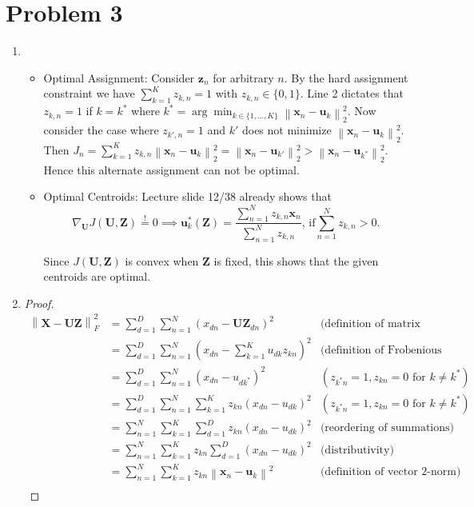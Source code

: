 \documentclass{scrartcl}
\newcommand{\norm}[1]{\left\lVert#1\right\rVert}
\begin{document}
  \section*{Problem 3} %
  \label{sec:problem_3}
  \begin{enumerate}
    \item \begin{itemize}
      \item Optimal Assignment:
        Consider $\mathbf{z}_n$ for arbitrary $n$. By the hard assignment
        constraint we have $\sum_{k=1}^K z_{k,n} = 1$ with $z_{k,n} \in \{0,1\}$.
        Line 2 dictates that $z_{k,n} = 1$ if $k = k^*$ where
        $k^* = \arg\min_{k \in \{1,\dots,K\}} \norm{\mathbf{x}_n - \mathbf{u}_k}_2^2$.
        Now consider the case where $z_{k',n} = 1$ and $k'$ does not minimize
        $\norm{\mathbf{x}_n - \mathbf{u}_k}_2^2$. Then $J_n = \sum_{k=1}^K z_{k,n}
        \norm{\mathbf{x}_n - \mathbf{u}_k}_2^2 = \norm{\mathbf{x}_n - \mathbf{u}_{k'}}_2^2
        > \norm{\mathbf{x}_n - \mathbf{u}_{k^*}}_2^2$. Hence this alternate assignment
        can not be optimal.
      \item Optimal Centroids:
        Lecture slide 12/38 already shows that
        \[
            \nabla_{\mathbf{U}} J(\mathbf{U}, \mathbf{Z}) \overset{!}{=} 0
            \implies \mathbf{u}_k^*(\mathbf{Z}) = \frac{\sum_{n=1}^N z_{k,n}\mathbf{x}_n}
            {\sum_{n=1}^N z_{k,n}}\text{, if} \sum_{n=1}^{N} z_{k,n} > 0.
        \]

        Since $J(\mathbf{U}, \mathbf{Z})$ is convex when $\mathbf{Z}$ is fixed,
        this shows that the given centroids are optimal.
    \end{itemize}
    \item \begin{proof}
    \begin{align*}
      \norm{\mathbf{X-UZ}}_F^2
       &= \sum_{d=1}^{D} \sum_{n=1}^{N} (x_{dn} - \mathbf{UZ}_{dn})^2
       &\text{(definition of matrix multiplication)}\\
       &= \sum_{d=1}^{D} \sum_{n=1}^{N} (x_{dn} - \sum_{k=1}^K u_{dk}z_{kn})^2
       &\text{(definition of Frobenious norm)}\\
       &= \sum_{d=1}^{D} \sum_{n=1}^{N} (x_{dn} - u_{dk^*})^2
       &(z_{k^*n} = 1, z_{kn} = 0\text{ for }k \neq k^*) \\
       &= \sum_{d=1}^{D} \sum_{n=1}^{N} \sum_{k=1}^{K} z_{kn} (x_{dn} - u_{dk})^2
       &(z_{k^*n} = 1, z_{kn} = 0\text{ for }k \neq k^*) \\
       &= \sum_{n=1}^{N} \sum_{k=1}^{K} \sum_{d=1}^{D} z_{kn} (x_{dn} - u_{dk})^2
       &\text{(reordering of summations)}\\
       &= \sum_{n=1}^{N} \sum_{k=1}^{K} z_{kn} \sum_{d=1}^{D} (x_{dn} - u_{dk})^2
       &\text{(distributivity)}\\
       &= \sum_{n=1}^{N} \sum_{k=1}^{K} z_{kn} \norm{\mathbf{x}_n - \mathbf{u}_k}^2
       &\text{(definition of vector 2-norm)}\\
    \end{align*}
    \end{proof}

  \end{enumerate}

\end{document}
